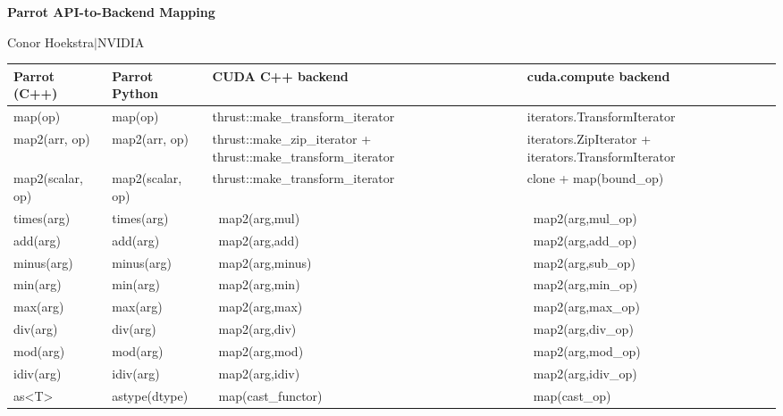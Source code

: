 \documentclass[10pt]{article}
\newcommand{\parrotemoji}{{\emojifont\normalsize\symbol{"1F99C}}}
\newcommand{\parrotimpl}{\parrotemoji}
\begin{document}
\begin{center}
{\LARGE\bfseries Parrot API-to-Backend Mapping}\par
\vspace{0.3em}
{\large Conor Hoekstra\enspace$|$\enspace NVIDIA}
\end{center}
\vspace{0.5em}

\noindent\begin{minipage}{\textwidth}
\captionsetup{skip=4pt}
\label{tab:api-map-1}
\footnotesize\ttfamily
\renewcommand{\arraystretch}{1.15}
\begin{tabularx}{\textwidth}{ll>{\raggedright\arraybackslash}X>{\raggedright\arraybackslash}X}
\toprule
\textrm{\textbf{Parrot (C++)}} & \textrm{\textbf{Parrot Python}} & \textrm{\textbf{CUDA C++ backend}} & \textrm{\textbf{cuda.compute backend}} \\
\midrule
map(op) & map(op) & thrust::make\_transform\_iterator & iterators.TransformIterator \\
map2(arr, op) & map2(arr, op) & thrust::make\_zip\_iterator + thrust::make\_transform\_iterator & iterators.ZipIterator + iterators.TransformIterator \\
map2(scalar, op) & map2(scalar, op) & thrust::make\_transform\_iterator & clone + map(bound\_op) \\
times(arg) & times(arg) & \parrotimpl\ map2(arg,mul) & \parrotimpl\ map2(arg,mul\_op) \\
add(arg) & add(arg) & \parrotimpl\ map2(arg,add) & \parrotimpl\ map2(arg,add\_op) \\
minus(arg) & minus(arg) & \parrotimpl\ map2(arg,minus) & \parrotimpl\ map2(arg,sub\_op) \\
min(arg) & min(arg) & \parrotimpl\ map2(arg,min) & \parrotimpl\ map2(arg,min\_op) \\
max(arg) & max(arg) & \parrotimpl\ map2(arg,max) & \parrotimpl\ map2(arg,max\_op) \\
div(arg) & div(arg) & \parrotimpl\ map2(arg,div) & \parrotimpl\ map2(arg,div\_op) \\
mod(arg) & mod(arg) & \parrotimpl\ map2(arg,mod) & \parrotimpl\ map2(arg,mod\_op) \\
idiv(arg) & idiv(arg) & \parrotimpl\ map2(arg,idiv) & \parrotimpl\ map2(arg,idiv\_op) \\
as<T> & astype(dtype) & \parrotimpl\ map(cast\_functor) & \parrotimpl\ map(cast\_op) \\

\end{tabularx}
\end{minipage}
\end{document}
